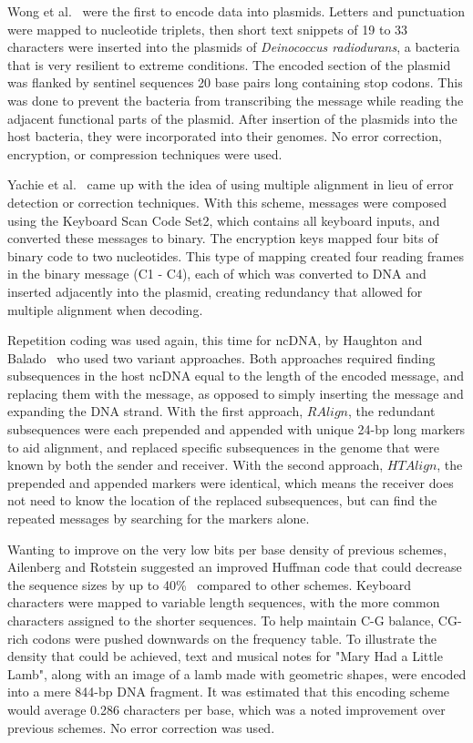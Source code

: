 \documentclass{bioinfo}
\begin{document}
Wong et al.~\cite{WWF2003COTACM} were the first to encode data into plasmids. Letters and punctuation were mapped to nucleotide triplets, then short text snippets of 19 to 33 characters were inserted into the plasmids of \textit{Deinococcus radiodurans}, a bacteria that is very resilient to extreme conditions. The encoded section of the plasmid was flanked by sentinel sequences 20 base pairs long containing stop codons. This was done to prevent the bacteria from transcribing the message while reading the adjacent functional parts of the plasmid. After insertion of the plasmids into the host bacteria, they were incorporated into their genomes. No error correction, encryption, or compression techniques were used.

Yachie et al.~\cite{YSSOT2007BP} came up with the idea of using multiple alignment in lieu of error detection or correction techniques. With this scheme, messages were composed using the Keyboard Scan Code Set2, which contains all keyboard inputs, and converted these messages to binary. The encryption keys mapped four bits of binary code to two nucleotides. This type of mapping created four reading frames in the binary message (C1 - C4), each of which was converted to DNA and inserted adjacently into the plasmid, creating redundancy that allowed for multiple alignment when decoding.

Repetition coding was used again, this time for ncDNA, by Haughton and Balado~\cite{HB2011IEEEICOBAB} who used two variant approaches. Both approaches required finding subsequences in the host ncDNA equal to the length of the encoded message, and replacing them with the message, as opposed to simply inserting the message and expanding the DNA strand. With the first approach, $RAlign$, the redundant subsequences were each prepended and appended with unique 24-bp long markers to aid alignment, and replaced specific subsequences in the genome that were known by both the sender and receiver. With the second approach, $HTAlign$, the prepended and appended markers were identical, which means the receiver does not need to know the location of the replaced subsequences, but can find the repeated messages by searching for the markers alone.

Wanting to improve on the very low bits per base density of previous schemes, Ailenberg and Rotstein suggested an improved Huffman code that could decrease the sequence sizes by up to 40\%~\cite{AR2009BT} compared to other schemes. Keyboard characters were mapped to variable length sequences, with the more common characters assigned to the shorter sequences. To help maintain C-G balance, CG-rich codons were pushed downwards on the frequency table. To illustrate the density that could be achieved, text and musical notes for "Mary Had a Little Lamb", along with an image of a lamb made with geometric shapes, were encoded into a mere 844-bp DNA fragment. It was estimated that this encoding scheme would average 0.286 characters per base, which was a noted improvement over previous schemes. No error correction was used.
\end{document}
